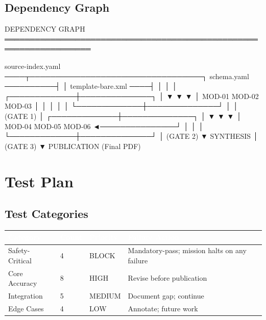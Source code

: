 \documentclass[11pt,letterpaper]{article}
\newcommand{\tableheader}[1]{\textbf{\sffamily\textcolor{white}{#1}}}
\begin{document}
\subsection{Dependency Graph}

\begin{asciibox}
DEPENDENCY GRAPH
═══════════════════════════════════════════════════════════════════

  source-index.yaml ────┬──────────────────────────────────┐
  schema.yaml ──────────┤                                  │
  template-bare.xml ────┤                                  │
                        │                                  │
          ┌─────────────┼──────────────┐                   │
          ▼             ▼              ▼                   │
        MOD-01        MOD-02        MOD-03                  │
          │             │              │                   │
          └─────────────┼──────────────┘                   │
                        │ (GATE 1)                         │
          ┌─────────────┼──────────────┐                   │
          ▼             ▼              ▼                   │
        MOD-04        MOD-05        MOD-06 ◄───────────────┘
          │             │              │
          └─────────────┼──────────────┘
                        │ (GATE 2)
                        ▼
                   SYNTHESIS
                        │ (GATE 3)
                        ▼
                  PUBLICATION
                    (Final PDF)
\end{asciibox}

\section{Test Plan}

\subsection{Test Categories}

\begin{center}
\begin{tabularx}{\textwidth}{L{3.5cm}C{1.5cm}L{2cm}X}
\toprule
{}
\tableheader{Category} & \tableheader{Count} & \tableheader{Priority} & \tableheader{Failure Action} \\
\midrule
Safety-Critical & 4 & BLOCK & Mandatory-pass; mission halts on any failure \\
Core Accuracy & 8 & HIGH & Revise before publication \\
Integration & 5 & MEDIUM & Document gap; continue \\
Edge Cases & 4 & LOW & Annotate; future work \\
\bottomrule
\end{tabularx}
\end{center}
\end{document}

